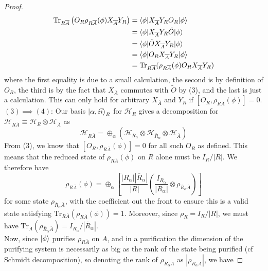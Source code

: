\documentclass[12pt,a4paper]{article}
\numberwithin{equation}{section}
\newcommand{\ol}[1]{\overline{#1}}
\theoremstyle{definition}
\theoremstyle{theorem}
\theoremstyle{example}
\begin{document}
\begin{itemize}
\begin{proof}
\begin{equation}
				\begin{aligned}
					\text{Tr}_{R\ol{A}}\left(O_{R}\rho_{R\ol{A}}(\phi)X_{\ol{A}}Y_{R}\right)&=\braket{\phi|X_{\ol{A}}Y_{R}O_{R}|\phi}\\&=\braket{\phi|X_{\ol{A}}Y_{R}\tilde{O}|\phi}\\&=\braket{\phi|\tilde{O}X_{\ol{A}}Y_{R}|\phi}\\&=\braket{\phi|O_{R}X_{\ol{A}}Y_{R}|\phi}\\&=\text{Tr}_{R\ol{A}}(\rho_{R\ol{A}}(\phi)O_{R}X_{\ol{A}}Y_{R})
				\end{aligned}
			\end{equation}
			where the first equality is due to a small calculation, the second is by definition of $O_R$, the third is by the fact that $X_{\ol{A}}$ commutes with $\tilde{O}$ by (3), and the last is just a calculation. This can only hold for arbitrary $X_{\ol{A}}$ and $Y_{R}$ if $[O_{R},\rho_{R\ol{A}}(\phi)]=0$.\\
			$(3)\implies (4)$: Our basis $\ket{\alpha,i\ol{i}}_{R}$ for $\mathcal{H}_{R}$ gives a decomposition for $\mathcal{H}_{R\ol{A}}\equiv\mathcal{H}_{R}\otimes\mathcal{H}_{\ol{A}}$ as
			\begin{equation}
				\mathcal{H}_{R\ol{A}}=\oplus_{\alpha}\left(\mathcal{H}_{R_{\alpha}}\otimes\mathcal{H}_{\ol{R}_{\alpha}}\otimes\mathcal{H}_{\ol{A}}\right)
			\end{equation}
			From (3), we know that $[O_{R},\rho_{R\ol{A}}(\phi)]=0$ for all such $O_{R}$ as defined. This means that the reduced state of $\rho_{R\ol{A}}(\phi)$ on $R$ alone must be $I_{R}/|R|$. We therefore have
			\begin{equation}
				\rho_{R\ol{A}}(\phi)=\oplus_{\alpha}\left[\frac{|R_{\alpha}||\ol{R}_{\alpha}|}{|R|}\left(\frac{I_{R_{\alpha}}}{|R_{\alpha}|}\otimes\rho_{\ol{R}_{\alpha}\ol{A}}\right)\right]
			\end{equation}
			for some state $\rho_{\ol{R}_{\alpha}\ol{A}}$, with the coefficient out the front to ensure this is a valid state satisfying $\text{Tr}_{R\ol{A}}(\rho_{R\ol{A}}(\phi))=1$. Moreover, since $\rho_{R}=I_{R}/|R|$, we must have $\text{Tr}_{\ol{A}}(\rho_{\ol{R}_{\alpha}\ol{A}})=I_{\ol{R}_{\alpha}}/|\ol{R}_{\alpha}|$.\\
			Now, since $\ket{\phi}$ purifies $\rho_{R\ol{A}}$ on $A$, and in a purification the dimension of the purifying system is necessarily as big as the rank of the state being purified (cf Schmidt decomposition), so denoting the rank of $\rho_{\ol{R}_{\alpha}\ol{A}}$ as $|\rho_{\ol{R}_{\alpha}\ol{A}}|$, we have

\end{proof}
\end{itemize}
\end{document}
